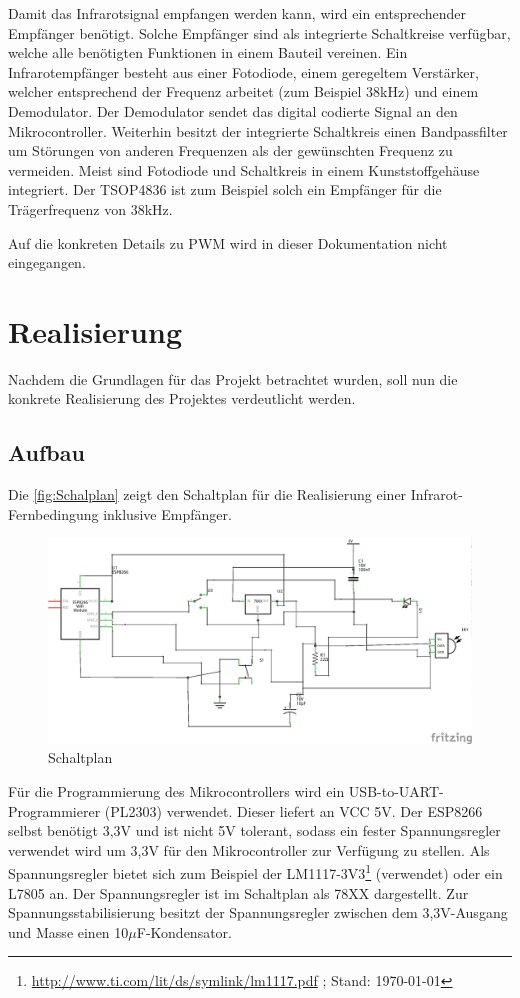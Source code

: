 Damit das Infrarotsignal empfangen werden kann, wird ein entsprechender Empfänger benötigt.
Solche Empfänger sind als integrierte Schaltkreise verfügbar, welche alle benötigten Funktionen in einem Bauteil vereinen.
Ein Infrarotempfänger besteht aus einer Fotodiode, einem geregeltem Verstärker, welcher entsprechend der Frequenz arbeitet (zum Beispiel 38kHz) und einem Demodulator.
Der Demodulator sendet das digital codierte Signal an den Mikrocontroller.
Weiterhin besitzt der integrierte Schaltkreis einen Bandpassfilter um Störungen von anderen Frequenzen als der gewünschten Frequenz zu vermeiden.
Meist sind Fotodiode und Schaltkreis in einem Kunststoffgehäuse integriert.
Der TSOP4836 ist zum Beispiel solch ein Empfänger für die Trägerfrequenz von 38kHz.

Auf die konkreten Details zu PWM wird in dieser Dokumentation nicht eingegangen.

\section{Realisierung}
Nachdem die Grundlagen für das Projekt betrachtet wurden, soll nun die konkrete Realisierung des Projektes verdeutlicht werden.

\subsection{Aufbau}
Die \autoref{fig:Schalplan} zeigt den Schaltplan für die Realisierung einer Infrarot-Fernbedingung inklusive Empfänger.

\begin{figure}
	\centering
	\includegraphics[scale=1]{Abbildungen/ESP8266_Schaltplan}
	\caption{Schaltplan}
	\label{fig:Schalplan}
\end{figure}

Für die Programmierung des Mikrocontrollers wird ein USB-to-UART-Programmierer (PL2303) verwendet.
Dieser liefert an VCC 5V.
Der ESP8266 selbst benötigt 3,3V und ist nicht 5V tolerant, sodass ein fester Spannungsregler verwendet wird um 3,3V für den Mikrocontroller zur Verfügung zu stellen.
Als Spannungsregler bietet sich zum Beispiel der LM1117-3V3\footnote{\url{http://www.ti.com/lit/ds/symlink/lm1117.pdf} ; Stand: \today} (verwendet) oder ein L7805 an.
Der Spannungsregler ist im Schaltplan als 78XX dargestellt.
Zur Spannungsstabilisierung besitzt der Spannungsregler zwischen dem 3,3V-Ausgang und Masse einen 10$\mu$F-Kondensator.

